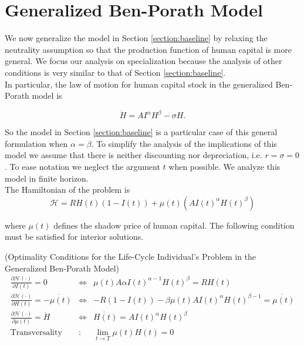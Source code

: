 \section{Generalized Ben-Porath Model} \label{section:generalized}
We now generalize the model in Section \ref{section:baseline} by relaxing the neutrality assumption so that the production function of human capital is more general. We focus our analysis on specialization because the analysis of other conditions is very similar to that of Section \ref{section:baseline}. \\

\indent In particular, the law of motion for human capital stock in the generalized Ben-Porath model is

\begin{equation}
\dot{H} = A I^{\alpha} H^{\beta} - \sigma H \label{eq:lawhgen}.
\end{equation}

\noindent So the model in Section \ref{section:baseline} is a particular case of this general formulation when $\alpha = \beta$. To simplify the analysis of the implications of this model we assume that there is neither discounting nor depreciation, i.e. $r = \sigma = 0$. To ease notation we neglect the argument $t$ when possible. We analyze this model in finite horizon.\\
\indent The Hamiltonian of the problem is
\begin{equation}
\mathcal{H} = RH(t) \left(1 - I(t) \right) + \mu(t) \left( A I(t)^{\alpha} H(t)^{\beta} \right)
\end{equation} 

\noindent where $\mu(t)$ defines the shadow price of human capital. The following condition must be satisfied for interior solutions.

\begin{condition} (Optimality Conditions for the Life-Cycle Individual's Problem in the Generalized Ben-Porath Model) \label{condition:optgen}
\begin{eqnarray}
\frac{\partial \mathcal{H} (\cdot)}{\partial I(t)} = 0 &\Leftrightarrow& \mu(t) A \alpha I(t)^{\alpha - 1} H(t)^{\beta} = RH(t) \label{eq:focinvestmentgen} \\
\frac{\partial \mathcal{H} (\cdot)}{\partial H(t)} = - \dot{\mu(t)} &\Leftrightarrow& -R(1 - I(t)) - \beta \mu(t) A I(t)^{\alpha} H(t)^{\beta -1} = \dot{\mu(t)} \label{eq:focstockgen} \\ 
\frac{\partial \mathcal{H} (\cdot)}{\partial \mu(t)} = \dot{H} &\Leftrightarrow& \dot{H(t)} = A I(t)^\alpha H(t)^\beta \label{eq:focmotiongen} \\
\text{Transversality} &:& \lim_{t \rightarrow T} \mu(t) H(t) = 0 \label{eq:foctransversalitygen}
\end{eqnarray}
\end{condition}

